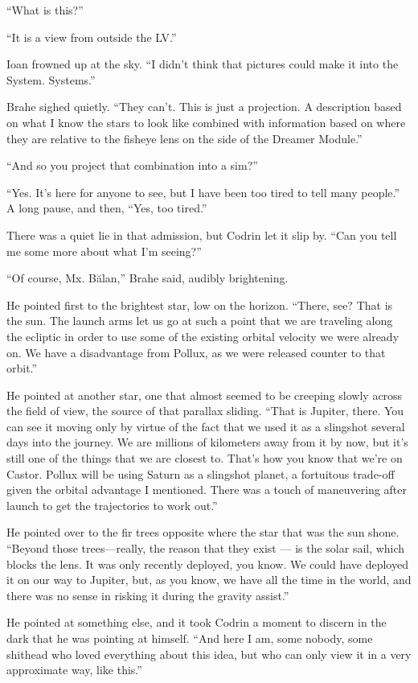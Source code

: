 ``What is this?''

``It is a view from outside the LV.''

Ioan frowned up at the sky. ``I didn't think that pictures could make it into the System. Systems.''

Brahe sighed quietly. ``They can't. This is just a projection. A description based on what I know the stars to look like combined with information based on where they are relative to the fisheye lens on the side of the Dreamer Module.''

``And so you project that combination into a sim?''

``Yes. It's here for anyone to see, but I have been too tired to tell many people.'' A long pause, and then, ``Yes, too tired.''

There was a quiet lie in that admission, but Codrin let it slip by. ``Can you tell me some more about what I'm seeing?''

``Of course, Mx. Bălan,'' Brahe said, audibly brightening.

He pointed first to the brightest star, low on the horizon. ``There, see? That is the sun. The launch arms let us go at such a point that we are traveling along the ecliptic in order to use some of the existing orbital velocity we were already on. We have a disadvantage from Pollux, as we were released counter to that orbit.''

He pointed at another star, one that almost seemed to be creeping slowly across the field of view, the source of that parallax sliding. ``That is Jupiter, there. You can see it moving only by virtue of the fact that we used it as a slingshot several days into the journey. We are millions of kilometers away from it by now, but it's still one of the things that we are closest to. That's how you know that we're on Castor. Pollux will be using Saturn as a slingshot planet, a fortuitous trade-off given the orbital advantage I mentioned. There was a touch of maneuvering after launch to get the trajectories to work out.''

He pointed over to the fir trees opposite where the star that was the sun shone. ``Beyond those trees---really, the reason that they exist — is the solar sail, which blocks the lens. It was only recently deployed, you know. We could have deployed it on our way to Jupiter, but, as you know, we have all the time in the world, and there was no sense in risking it during the gravity assist.''

He pointed at something else, and it took Codrin a moment to discern in the dark that he was pointing at himself. ``And here I am, some nobody, some shithead who loved everything about this idea, but who can only view it in a very approximate way, like this.''

